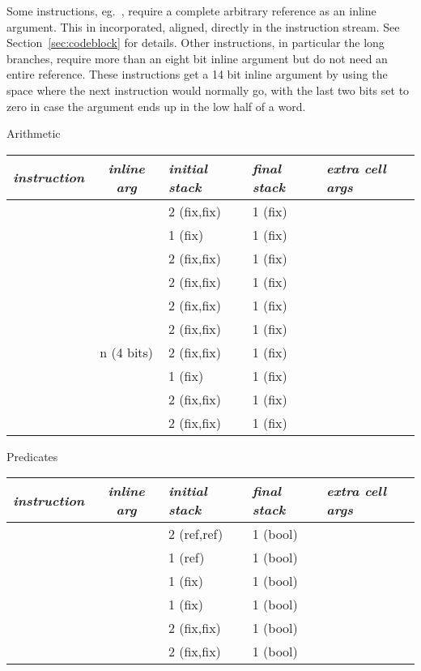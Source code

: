 Some instructions, eg.\ , require a complete arbitrary
reference as an inline argument.  This in incorporated, aligned,
directly in the instruction stream.  See Section~\ref{sec:codeblock}
for details.  Other instructions, in particular the long branches,
require more than an eight bit inline argument but do not need an
entire reference.  These instructions get a 14 bit inline argument by
using the space where the next instruction would normally go, with the
last two bits set to zero in case the argument ends up in the low half
of a word.

\newenvironment{itable}[1]{
\begin{center} \par \nopagebreak #1 \par \nopagebreak
\begin{tabular}{|l|c|l|l|l|} \hline
\emph{instruction} & \emph{inline arg} & \emph{initial stack}
 & \emph{final stack} & \emph{extra cell args}
\\\hline\hline}{\hline\end{tabular}\end{center}}

\newcommand{\icomment}[1]{\multicolumn{5}{|l|}{\parbox{4in}{#1}}\\\hline}

\begin{itable}{Arithmetic}
\df{plus}	& 		& 2 (fix,fix)	& 1 (fix)	& \\ \hline
\df{minus}	&		& 1 (fix)	& 1 (fix)	& \\ \hline
\df{subtract}	& 		& 2 (fix,fix)	& 1 (fix)	& \\ \hline
\df{times}	& 		& 2 (fix,fix)	& 1 (fix)	& \\ \hline
\df{mod}	& 		& 2 (fix,fix)	& 1 (fix)	& \\ \hline
\df{div}	& 		& 2 (fix,fix)	& 1 (fix)	& \\ \hline
\df{log-op}	& n (4 bits)	& 2 (fix,fix)	& 1 (fix)	& \\ \hline
\df{bit-not}	& 		& 1 (fix)	& 1 (fix)	& \\ \hline
\df{rot}	& 		& 2 (fix,fix)	& 1 (fix)	& \\ \hline
\df{ash}	& 		& 2 (fix,fix)	& 1 (fix)	& \\ \hline
\end{itable}

\begin{itable}{Predicates}
\df{eq?}& 		& 2 (ref,ref)	& 1 (bool)	& \\ \hline
\df{not}& 		& 1 (ref)	& 1 (bool)	& \\ \hline
\df{<0?}& 		& 1 (fix)	& 1 (bool)	& \\ \hline
\df{=0?}& 		& 1 (fix)	& 1 (bool)	& \\ \hline
\df{=}	& 		& 2 (fix,fix)	& 1 (bool)	& \\ \hline
\df{<}	& 		& 2 (fix,fix)	& 1 (bool)	& \\ \hline
\end{itable}


